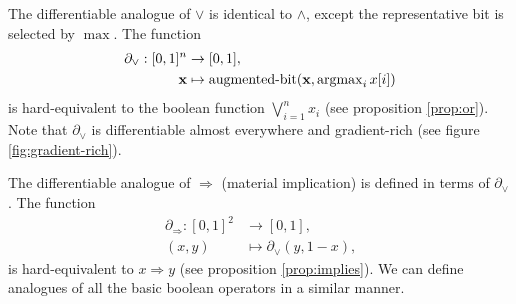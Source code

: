 \documentclass{article} %
\begin{document}
The differentiable analogue of $\vee$ is identical to $\wedge$, except the representative bit is selected by $\operatorname{max}$. The function
\begin{equation*}
\begin{aligned}
\partial_{\vee}: [0,1]^{n} &\to [0,1], \\
{\bf x} &\mapsto \operatorname{augmented-bit}({\bf x}, \operatorname{argmax}\limits_{i} x[i])
\end{aligned}
\end{equation*}
is hard-equivalent to the boolean function $\bigvee_{i=1}^{n} x_i$ (see proposition \ref{prop:or}). Note that $\partial_{\vee}$ is differentiable almost everywhere and gradient-rich (see figure \ref{fig:gradient-rich}).

The differentiable analogue of $\Rightarrow$ (material implication) is defined in terms of $\partial_{\vee}$. The function
\begin{equation*}
\begin{aligned}
\partial_{\Rightarrow}: [0,1]^{2} &\to [0,1],\\
(x, y) &\mapsto \partial_{\vee}\!(y, 1-x)\text{,}
\end{aligned}
\end{equation*}
is hard-equivalent to $x \Rightarrow y$ (see proposition \ref{prop:implies}). We can define  analogues of all the basic boolean operators in a similar manner.
\end{document}
